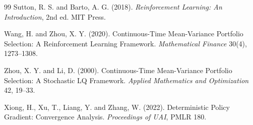 \documentclass[11pt,a4paper]{article}
\theoremstyle{plain}
\theoremstyle{definition}
\theoremstyle{remark}
\begin{document}
\begin{thebibliography}{99}
 Sutton, R. S. and Barto, A. G. (2018).
\emph{Reinforcement Learning: An Introduction}, 2nd ed. MIT Press.

 Wang, H. and Zhou, X. Y. (2020).
Continuous-Time Mean-Variance Portfolio Selection: A Reinforcement Learning
Framework. \emph{Mathematical Finance} 30(4), 1273--1308.

 Zhou, X. Y. and Li, D. (2000). Continuous-Time
Mean-Variance Portfolio Selection: A Stochastic LQ Framework. \emph{Applied
Mathematics and Optimization} 42, 19--33.

 Xiong, H., Xu, T., Liang, Y. and Zhang, W.
(2022). Deterministic Policy Gradient: Convergence Analysis. \emph{Proceedings of
UAI}, PMLR 180.

\end{thebibliography}
\end{document}
